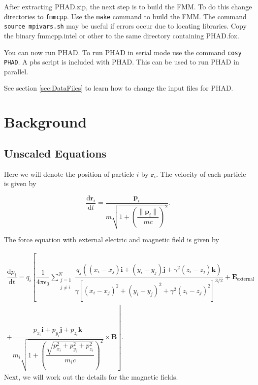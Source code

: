 \documentclass[oneside,12pt]{book}
\renewcommand{\vec}{\mathbf}
\begin{document}
After extracting PHAD.zip, the next step is to build the FMM.  To do this change directories to \texttt{fmmcpp}.  Use the \texttt{make} command to build the FMM.  The command \texttt{source mpivars.sh} may be useful if errors occur due to locating libraries.  Copy the binary fmmcpp.intel or other to the same directory containing PHAD.fox.

You can now run PHAD.  To run PHAD in serial mode use the command \texttt{cosy PHAD}.  A pbs script is included with PHAD.  This can be used to run PHAD in parallel.  


See section \ref{sec:DataFiles}  to learn how to change the input files for PHAD.



\chapter{Background}

\section{Unscaled Equations}

Here we will denote the position of particle $i$ by $\vec{r}_i$.  The velocity of each particle is given by

\begin{equation}
\dfrac{\text{d}\vec{r}_i}{\text{d}t}=\dfrac{\vec{p}_i}{m \sqrt{1+\left(\dfrac{\| \vec{p}_i\| }{mc}\right)^2}}.
\label{dervr}
\end{equation}

The force equation with external electric and magnetic field is given by 

\begin{multline}
\dfrac{\text{d}p_i}{\text{d}t}=q_i\left[
\dfrac{1}{4 \pi \epsilon_0}
\mathop{\sum}_{
\begin{array}{c}
{j=1}  \\
{j \neq i}
\end{array}}^N
\dfrac{q_j\left((x_i-x_j)\vec{i}+(y_i-y_j)\vec{j}+\gamma^2(z_i-z_j)\vec{k}\right)}{\gamma[(x_i-x_j)^2+(y_i-y_j)^2+\gamma^2(z_i-z_j)^2]^{3\slash 2}}+\vec{E}_\text{external}\right. \\
\left.+\dfrac{p_{x_i} \vec{i} + p_{y_i} \vec{j} + p_{z_i} \vec{k}}{m_i \sqrt{1+\left(
 \dfrac{\sqrt{p_{x_i}^2 + p_{y_i}^2 + p_{z_i}^2}}{m_i c}\right)^2}} \times \vec{B} \right].
 \label{diffpall} 
 \end{multline}
Next, we will work out the details for the magnetic fields.
\end{document}
